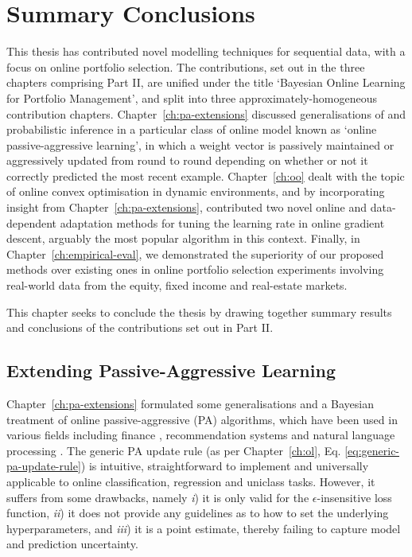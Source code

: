 \chapter{Summary Conclusions}
\label{ch:summary-conclusions}

\minitoc

This thesis has contributed novel modelling techniques for sequential data, with a focus on online portfolio selection. The contributions, set out in the three chapters comprising Part II, are unified under the title `Bayesian Online Learning for Portfolio Management', and split into three approximately-homogeneous contribution chapters. Chapter~\ref{ch:pa-extensions} discussed generalisations of and probabilistic inference in a particular class of online model known as `online passive-aggressive learning', in which a weight vector is passively maintained or aggressively updated from round to round depending on whether or not it correctly predicted the most recent example. Chapter~\ref{ch:oo} dealt with the topic of online convex optimisation in dynamic environments, and by incorporating insight from Chapter~\ref{ch:pa-extensions}, contributed two novel online and data-dependent adaptation methods for tuning the learning rate in online gradient descent, arguably the most popular algorithm in this context. Finally, in Chapter~\ref{ch:empirical-eval}, we demonstrated the superiority of our proposed methods over existing ones in online portfolio selection experiments involving real-world data from the equity, fixed income and real-estate markets.

This chapter seeks to conclude the thesis by drawing together summary results and conclusions of the contributions set out in Part II.


\section{Extending Passive-Aggressive Learning}

Chapter~\ref{ch:pa-extensions} formulated some generalisations and a Bayesian treatment of online passive-aggressive (PA) algorithms, which have been used in various fields including finance \citep{pamr, olmar}, recommendation systems \citep{blondel14} and natural language processing \citep{bayespa}. The generic PA update rule (as per Chapter~\ref{ch:ol}, Eq. \eqref{eq:generic-pa-update-rule}) is intuitive, straightforward to implement and universally applicable to online classification, regression and uniclass tasks. However, it suffers from some drawbacks, namely \textit{i}) it is only valid for the $\epsilon$-insensitive loss function, \textit{ii}) it does not provide any guidelines as to how to set the underlying hyperparameters, and \textit{iii}) it is a point estimate, thereby failing to capture model and prediction uncertainty.

